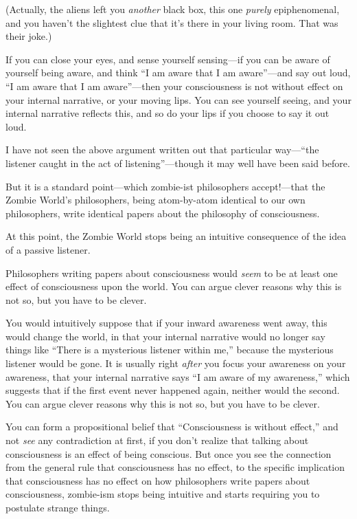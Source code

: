 {
 (Actually, the aliens left you \textit{another} black box, this
one \textit{purely} epiphenomenal, and you haven't the
slightest clue that it's there in your living room.
That was their joke.)}

{
 If you can close your eyes, and sense yourself sensing---if you
can be aware of yourself being aware, and think ``I am
aware that I am aware''---and say out loud,
``I am aware that I am
aware''---then your consciousness is not without
effect on your internal narrative, or your moving lips. You can see
yourself seeing, and your internal narrative reflects this, and so do
your lips if you choose to say it out loud.}

{
 I have not seen the above argument written out that particular
way---``the listener caught in the act of
listening''---though it may well have been said
before.}

{
 But it is a standard point{}---which zombie-ist philosophers
accept!---that the Zombie World's philosophers, being
atom-by-atom identical to our own philosophers, write identical papers
about the philosophy of consciousness.}

{
 At this point, the Zombie World stops being an intuitive
consequence of the idea of a passive listener.}

{
 Philosophers writing papers about consciousness would
\textit{seem} to be at least one effect of consciousness upon the
world. You can argue clever reasons why this is not so, but you have to
be clever.}

{
 You would intuitively suppose that if your inward awareness went
away, this would change the world, in that your internal narrative
would no longer say things like ``There is a
mysterious listener within me,'' because the
mysterious listener would be gone. It is usually right \textit{after}
you focus your awareness on your awareness, that your internal
narrative says ``I am aware of my
awareness,'' which suggests that if the first event
never happened again, neither would the second. You can argue clever
reasons why this is not so, but you have to be clever.}

{
 You can form a propositional belief that
``Consciousness is without effect,''
and not \textit{see} any contradiction at first, if you
don't realize that talking about consciousness is an
effect of being conscious. But once you see the connection from the
general rule that consciousness has no effect, to the specific
implication that consciousness has no effect on how philosophers write
papers about consciousness, zombie-ism stops being intuitive and starts
requiring you to postulate strange things.}

